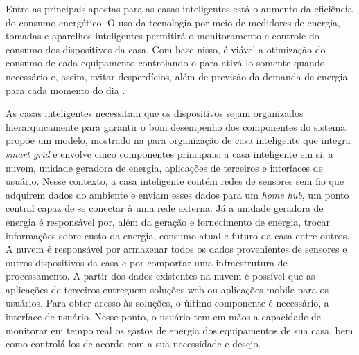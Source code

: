 Entre as principais apostas para as casas inteligentes está o aumento da eficiência do consumo energético. O uso da tecnologia por meio de medidores de energia, tomadas e aparelhos inteligentes permitirá o monitoramento e controle do consumo dos dispositivos da casa. Com base nisso, é viável a otimização do consumo de cada equipamento controlando-o para ativá-lo somente quando necessário e, assim, evitar desperdícios, além de previsão da demanda de energia para cada momento do dia \cite{Stojkoska2017}.

As casas inteligentes necessitam que os dispositivos sejam organizados hierarquicamente para garantir o bom desempenho dos componentes do sistema.  propõe um modelo, mostrado na  para organização de casa inteligente que integra \textit{smart grid} e envolve cinco componentes principais: a casa inteligente em si, a nuvem, unidade geradora de energia, aplicações de terceiros e interfaces de usuário. Nesse contexto, a casa inteligente contém redes de sensores sem fio que adquirem dados do ambiente e enviam esses dados para um \textit{home hub}, um ponto central capaz de se conectar à uma rede externa. Já a unidade geradora de energia é responsável por, além da geração e fornecimento de energia, trocar informações sobre custo da energia, consumo atual e futuro da casa entre outros. A nuvem é responsável por armazenar todos os dados provenientes de sensores e outros dispositivos da casa e por comportar uma infraestrutura de processamento. A partir dos dados existentes na nuvem é possível que as aplicações de terceiros entreguem soluções web ou aplicações mobile para os usuários. Para obter acesso às soluções, o último componente é necessário, a interface de usuário. Nesse ponto, o usuário tem em mãos a capacidade de monitorar em tempo real os gastos de energia dos equipamentos de sua casa, bem como controlá-los de acordo com a sua necessidade e desejo.







